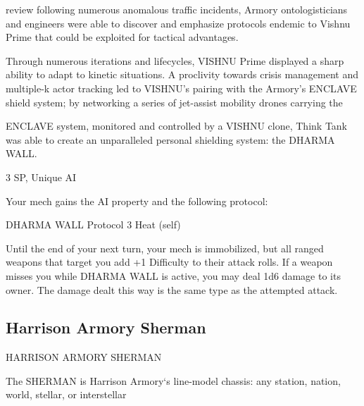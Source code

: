review following numerous anomalous traffic incidents, Armory ontologisticians and engineers were able to  
discover and emphasize protocols endemic to Vishnu Prime that could be exploited for tactical advantages.   

                                                                                                                      


Through numerous iterations and lifecycles, VISHNU Prime displayed a sharp ability to adapt to kinetic  
situations. A proclivity towards crisis management and multiple-k actor tracking led to VISHNU’s pairing  
with the Armory’s ENCLAVE shield system; by networking a series of jet-assist mobility drones carrying the  

ENCLAVE system, monitored and controlled by a VISHNU clone, Think Tank was able to create an  
unparalleled personal shielding system: the DHARMA WALL.  
 

3 SP, Unique  
AI  

Your mech gains the AI property and the following protocol:
 

         DHARMA WALL  
         Protocol  
         3 Heat (self)  

         Until the end of your next turn, your mech is immobilized, but all ranged weapons that  
         target you add +1 Difficulty to their attack rolls. If a weapon misses you while DHARMA  
         WALL is active, you may deal 1d6 damage to its owner. The damage dealt this way is the  
         same type as the attempted attack.
 

                                                                                                                    


                                                                                                                            
\subsection{Harrison Armory Sherman}
                                                                                                                      


                              HARRISON ARMORY SHERMAN  

The SHERMAN is Harrison Armory‘s line-model chassis: any station, nation, world, stellar, or interstellar  

